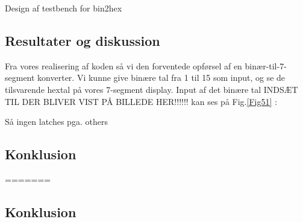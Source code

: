 \documentclass[../journal.tex]{subfiles}
\begin{document}
\begin{table}[H]
    \centering
    \caption{Design af testbench for bin2hex}	
    \label{src:bin2hex_test}
\end{table}

\subsection{Resultater og diskussion}


Fra vores realisering af koden så vi den forventede opførsel af en binær-til-7-segment konverter. Vi kunne give binære tal fra 1 til 15 som input, og se de tilsvarende hextal på vores 7-segment display. Input af det binære tal INDSÆT TIL DER BLIVER VIST PÅ BILLEDE HER!!!!!! kan ses på Fig.\ref{Fig51} :



Så ingen latches pga. others


\subsection{Konklusion}
=======



\subsection{Konklusion}
\end{document}

